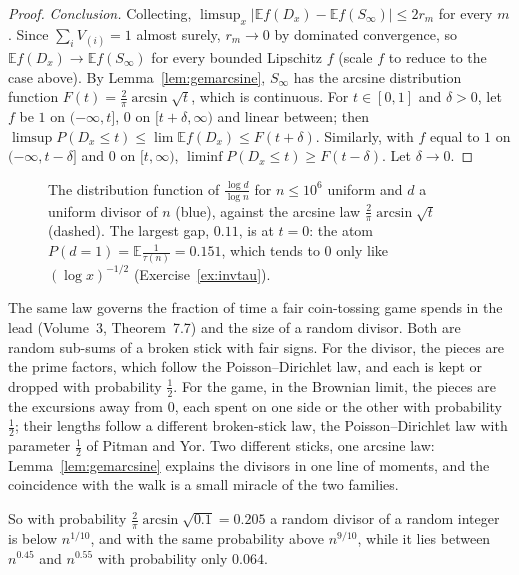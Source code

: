 \begin{proof}
\emph{Conclusion.} Collecting, $\limsup_x|\mathbb Ef(D_x)-\mathbb Ef(S_\infty)|\le2r_m$ for every $m$. Since $\sum_iV_{(i)}=1$ almost surely, $r_m\to0$ by dominated convergence, so $\mathbb Ef(D_x)\to\mathbb Ef(S_\infty)$ for every bounded Lipschitz $f$ (scale $f$ to reduce to the case above). By Lemma~\ref{lem:gemarcsine}, $S_\infty$ has the arcsine distribution function $F(t)=\frac2\pi\arcsin\sqrt t$, which is continuous. For $t\in[0,1]$ and $\delta>0$, let $f$ be $1$ on $(-\infty,t]$, $0$ on $[t+\delta,\infty)$ and linear between; then $\limsup P(D_x\le t)\le\lim\mathbb Ef(D_x)\le F(t+\delta)$. Similarly, with $f$ equal to $1$ on $(-\infty,t-\delta]$ and $0$ on $[t,\infty)$, $\liminf P(D_x\le t)\ge F(t-\delta)$. Let $\delta\to0$.
\end{proof}

\begin{figure}[ht]
\centering{}
\caption{The distribution function of $\frac{\log d}{\log n}$ for $n\le10^6$ uniform and $d$ a uniform divisor of $n$ (blue), against the arcsine law $\frac2\pi\arcsin\sqrt t$ (dashed). The largest gap, $0.11$, is at $t=0$: the atom $P(d=1)=\mathbb E\frac1{\tau(n)}=0.151$, which tends to $0$ only like $(\log x)^{-1/2}$ (Exercise~\ref{ex:invtau}).}
\label{fig:arcsine}
\end{figure}

\begin{beauty}
The same law governs the fraction of time a fair coin-tossing game spends in the lead (Volume~3, Theorem~7.7) and the size of a random divisor. Both are random sub-sums of a broken stick with fair signs. For the divisor, the pieces are the prime factors, which follow the Poisson--Dirichlet law, and each is kept or dropped with probability $\frac12$. For the game, in the Brownian limit, the pieces are the excursions away from $0$, each spent on one side or the other with probability $\frac12$; their lengths follow a different broken-stick law, the Poisson--Dirichlet law with parameter $\frac12$ of Pitman and Yor. Two different sticks, one arcsine law: Lemma~\ref{lem:gemarcsine} explains the divisors in one line of moments, and the coincidence with the walk is a small miracle of the two families.
\end{beauty}

So with probability $\frac2\pi\arcsin\sqrt{0.1}=0.205$ a random divisor of a random integer is below $n^{1/10}$, and with the same probability above $n^{9/10}$, while it lies between $n^{0.45}$ and $n^{0.55}$ with probability only $0.064$.

